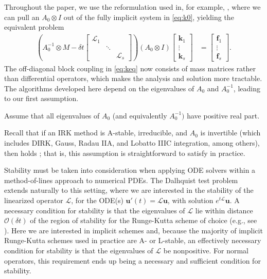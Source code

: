 \documentclass[review]{siamart}
\begin{document}
Throughout the paper, we use the reformulation used in, for example,
\cite{pazner17}, where we can pull an $A_0\otimes I$ out of the
fully implicit system in \eqref{eq:k0}, yielding the equivalent problem
%
\begin{align}\label{eq:keq}
\left( A_0^{-1}\otimes M - \delta t \begin{bmatrix} \mathcal{L}_1  & \\ & \ddots \\ && \mathcal{L}_s\end{bmatrix}\right)
	(A_0\otimes I)	\begin{bmatrix} \mathbf{k}_1 \\ \vdots \\ \mathbf{k}_s \end{bmatrix}
& = \begin{bmatrix} \mathbf{f}_1 \\ \vdots \\ \mathbf{f}_s \end{bmatrix}.
\end{align}
%
The off-diagonal block coupling in \eqref{eq:keq} now consists of mass matrices
rather than differential operators, which makes the analysis and solution more
tractable.
The algorithms developed here depend on the eigenvalues of $A_0$ and
$A_0^{-1}$, leading to our first assumption.
%
\begin{assumption}\label{ass:eig}
Assume that all eigenvalues of $A_0$ (and equivalently $A_0^{-1})$ have positive real part.
\end{assumption}
%
Recall that if an IRK method is A-stable, irreducible, and $A_0$ is invertible
(which includes DIRK, Gauss, Radau IIA, and Lobatto IIIC integration, among others),
then  holds \cite{hairer96}; that is, this assumption is
straightforward to satisfy in practice.

Stability must be taken into consideration when applying ODE solvers within a
method-of-lines approach to numerical PDEs. The Dalhquist test problem extends
naturally to this setting, where we are interested in the stability of the
linearized operator $\mathcal{L}$, for the ODE(s)
$\mathbf{u}'(t) = \mathcal{L}\mathbf{u}$, with solution $e^{t\mathcal{L}}\mathbf{u}$.
A necessary condition for stability is that the eigenvalues of $\mathcal{L}$
lie within distance $\mathcal{O}(\delta t)$ of the region of stability for
the Runge-Kutta scheme of choice (e.g., see \cite{reddy92}). Here we are
interested in implicit schemes and, because the majority of implicit Runge-Kutta schemes
used in practice are A- or L-stable, an effectively necessary condition for
stability is that the eigenvalues of $\mathcal{L}$ be nonpositive. For
normal operators, this requirement ends up being a necessary and sufficient
condition for stability.
\end{document}
